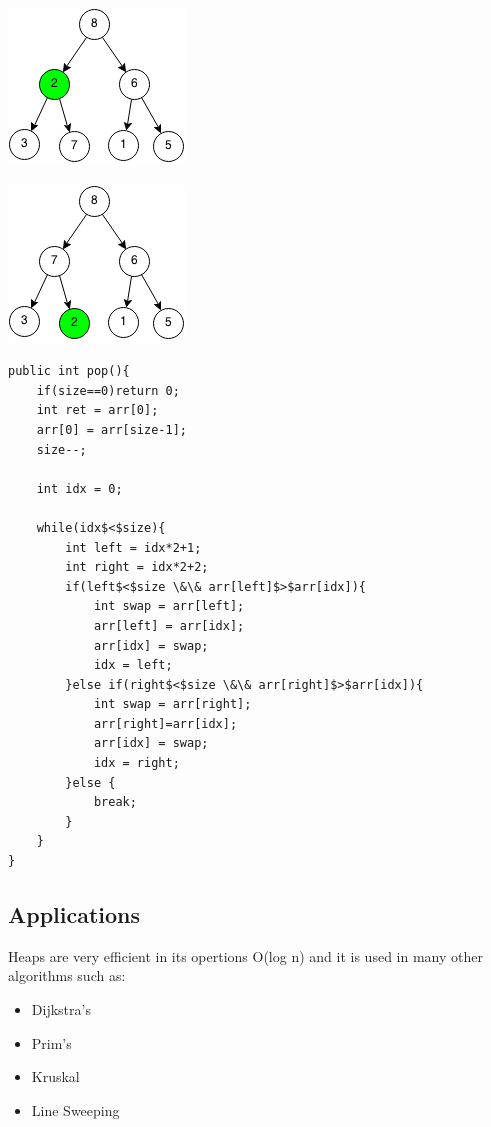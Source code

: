 \documentclass[11pt,oneside]{book}
\makeatletter
\def\maxwidth#1{\ifdim\Gin@nat@width>#1 #1\else\Gin@nat@width\fi}
\makeatother
\begin{document}
\includegraphics[width=\maxwidth{\textwidth}]{maxheappop2.png}

\includegraphics[width=\maxwidth{\textwidth}]{maxheappop3.png}

\begin{lstlisting}
public int pop(){
    if(size==0)return 0;
    int ret = arr[0];
    arr[0] = arr[size-1];
    size--;
        
    int idx = 0;
        
    while(idx$<$size){
        int left = idx*2+1;
        int right = idx*2+2;
        if(left$<$size \&\& arr[left]$>$arr[idx]){
            int swap = arr[left];
            arr[left] = arr[idx];
            arr[idx] = swap;
            idx = left;
        }else if(right$<$size \&\& arr[right]$>$arr[idx]){
            int swap = arr[right];
            arr[right]=arr[idx];
            arr[idx] = swap;
            idx = right;
        }else {
            break;
        }
    }
}
\end{lstlisting}

\subsection{Applications}

Heaps are very efficient in its opertions O(log n) and it is used in many other algorithms such as:

\begin{itemize}
\item Dijkstra's
\item Prim's
\item Kruskal
\item Line Sweeping
\end{itemize}
\end{document}
